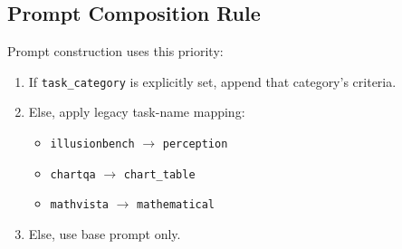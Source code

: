 \documentclass{article}
\theoremstyle{plain}
\theoremstyle{definition}
\theoremstyle{remark}
\begin{document}
\subsection{Prompt Composition Rule}
Prompt construction uses this priority:
\begin{enumerate}
\item If \texttt{task\_category} is explicitly set, append that category's criteria.
\item Else, apply legacy task-name mapping:
\begin{itemize}
\item \texttt{illusionbench} \(\rightarrow\) \texttt{perception}
\item \texttt{chartqa} \(\rightarrow\) \texttt{chart\_table}
\item \texttt{mathvista} \(\rightarrow\) \texttt{mathematical}
\end{itemize}
\item Else, use base prompt only.
\end{enumerate}
\end{document}
